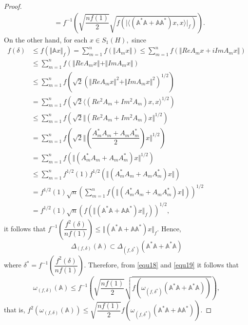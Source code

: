 \documentclass[12pt]{article}
\begin{document}
\begin{proof}
\begin{align}
&= f^{-1}\left( \sqrt{\dfrac{nf(1)}{2}}\sqrt{f\left(\vert \langle \left( \mathbb{A}^{*}\mathbb{A}+\mathbb{A}\mathbb{A}^{*} \right)x,x\rangle  \vert_{f} \right)} \right).
\end{align}
On the other hand, for each $ x\in S_{1}(H), $ since
\begin{align*}
f(\delta)&\leq f\left( \Vert \mathbb{A}x \Vert_{f} \right) = \sum\limits_{m=1}^{n} f\left( \Vert A_{m}x \Vert \right) \leq \sum\limits_{m=1}^{n}f\left( \Vert ReA_{m}x+iImA_{m}x \Vert \right)  \\
&\leq \sum\limits_{m=1}^{n} f\left(  \Vert ReA_{m}x \Vert + \Vert ImA_{m}x \Vert\right) \\
& \leq \sum\limits_{m=1}^{n} f\left(  \sqrt{2}\left( \Vert ReA_{m}x \Vert^{2} + \Vert ImA_{m}x \Vert^{2}\right)^{1/2} \right) \\
&= \sum\limits_{m=1}^{n} f\left(  \sqrt{2}\langle \left( Re^{2}A_{m}+ Im^{2}A_{m} \right)x,x\rangle^{1/2} \right) \\
&\leq \sum\limits_{m=1}^{n}f\left( \sqrt{2} \Vert \left( Re^{2}A_{m}+Im^{2}A_{m}\right) x \Vert^{1/2}\right) \\
&= \sum\limits_{m=1}^{n}f\left( \sqrt{2}\Vert \left( \dfrac{A_{m}^{*}A_{m}+A_{m}A_{m}^{*}}{2} \right) x \Vert^{1/2}  \right) \\
&= \sum\limits_{m=1}^{n}f\left( \Vert \left(  A_{m}^{*}A_{m}+A_{m}A_{m}^{*}\right) x \Vert^{1/2} \right)   \\
&\leq \sum\limits_{m=1}^{n}f^{1/2}(1) f^{1/2} \left( \Vert \left(  A_{m}^{*}A_{m}+A_{m}A_{m}^{*}\right) x \Vert \right) \\
&= f^{1/2}(1)\sqrt{n} \left( \sum\limits_{m=1}^{n}f\left( \Vert \left(  A_{m}^{*}A_{m}+A_{m}A_{m}^{*}\right) x \Vert \right)  \right)^{1/2} \\
&= f^{1/2}(1)\sqrt{n} \left( f \left( \Vert \left(  \mathbb{A}^{*}\mathbb{A}+\mathbb{A}\mathbb{A}^{*}\right) x \Vert_{f} \right)  \right) ^{1/2},
\end{align*}
it follows that
\(
f^{-1} \left(\dfrac{f^{2}(\delta)}{nf(1)}\right)  \leq \Vert \left(  \mathbb{A}^{*}\mathbb{A}+\mathbb{A}\mathbb{A}^{*}\right) x \Vert_{f}  .
\)
Hence,
\begin{equation}
\label{equ19}
\Delta_{(f,\delta )}(\mathbb{A})\subset \Delta_{(f,\delta^{*})}(\mathbb{A}^{*}\mathbb{A}+\mathbb{A}^{*}\mathbb{A})
\end{equation}
where $ \delta^{*}=f^{-1}\left( \dfrac{f^{2}(\delta)}{nf(1)}\right) . $
Therefore, from \eqref{equ18} and \eqref{equ19} it follows that
\[
\omega_{(f,\delta)}(\mathbb{A})\leq f^{-1}\left( \sqrt{\dfrac{nf(1)}{2}}\sqrt{f\left( \omega_{(f,\delta^{*})}(\mathbb{A}^{*}\mathbb{A}+\mathbb{A}^{*}\mathbb{A})\right) } \right) ,
\]
that is,
\(
f^{2}\left( \omega_{(f,\delta )}(\mathbb{A}  ) \right) \leq \sqrt{\dfrac{nf(1)}{2}}f\left(  \omega_{(f,\delta^{*})}\left( \mathbb{A}^{*}\mathbb{A}+\mathbb{A}\mathbb{A}^{*} \right) \right) .
\)
\end{proof}
\end{document}
